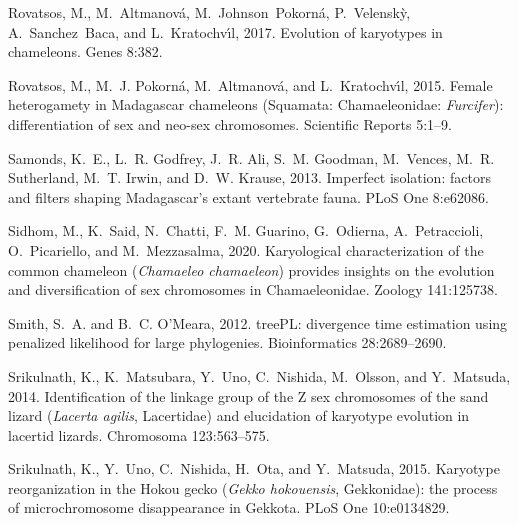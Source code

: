 \documentclass[a4paper, 12pt]{article}
\begin{document}
\begin{thebibliography}{73}
Rovatsos, M., M.~Altmanov{\'a}, M.~Johnson~Pokorn{\'a}, P.~Velensk{\`y},
  A.~Sanchez~Baca, and L.~Kratochv{\'\i}l, 2017.
\newblock Evolution of karyotypes in chameleons.
\newblock Genes 8:382.

Rovatsos, M., M.~J. Pokorn{\'a}, M.~Altmanov{\'a}, and L.~Kratochv{\'\i}l,
  2015.
\newblock Female heterogamety in {M}adagascar chameleons ({S}quamata:
  {C}hamaeleonidae: \textit{{F}urcifer}): differentiation of sex and neo-sex
  chromosomes.
\newblock Scientific Reports 5:1--9.

Samonds, K.~E., L.~R. Godfrey, J.~R. Ali, S.~M. Goodman, M.~Vences, M.~R.
  Sutherland, M.~T. Irwin, and D.~W. Krause, 2013.
\newblock Imperfect isolation: factors and filters shaping {M}adagascar's
  extant vertebrate fauna.
\newblock PLoS One 8:e62086.

Sidhom, M., K.~Said, N.~Chatti, F.~M. Guarino, G.~Odierna, A.~Petraccioli,
  O.~Picariello, and M.~Mezzasalma, 2020.
\newblock Karyological characterization of the common chameleon
  (\textit{Chamaeleo chamaeleon}) provides insights on the evolution and
  diversification of sex chromosomes in {C}hamaeleonidae.
\newblock Zoology 141:125738.

Smith, S.~A. and B.~C. O'Meara, 2012.
\newblock tree{PL}: divergence time estimation using penalized likelihood for
  large phylogenies.
\newblock Bioinformatics 28:2689--2690.

Srikulnath, K., K.~Matsubara, Y.~Uno, C.~Nishida, M.~Olsson, and Y.~Matsuda,
  2014.
\newblock Identification of the linkage group of the {Z} sex chromosomes of the
  sand lizard (\textit{Lacerta agilis}, {L}acertidae) and elucidation of
  karyotype evolution in lacertid lizards.
\newblock Chromosoma 123:563--575.

Srikulnath, K., Y.~Uno, C.~Nishida, H.~Ota, and Y.~Matsuda, 2015.
\newblock Karyotype reorganization in the {H}okou gecko (\textit{Gekko
  hokouensis}, {G}ekkonidae): the process of microchromosome disappearance in
  {G}ekkota.
\newblock PLoS One 10:e0134829.


\end{thebibliography}
\end{document}
